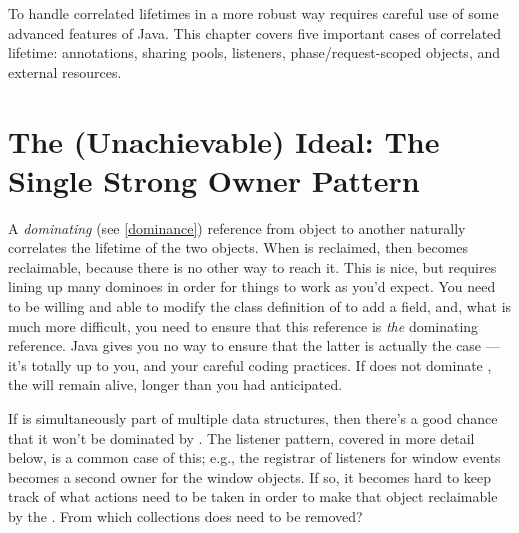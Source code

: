 To handle correlated lifetimes in a more robust way requires careful use of some
advanced features of Java. This chapter covers five important cases of
correlated lifetime: annotations, sharing pools, listeners, phase/request-scoped
objects, and external resources.


\section{The (Unachievable) Ideal: The Single Strong Owner Pattern}

A \emph{dominating} (see \autoref{dominance}) reference from object  to
another  naturally correlates the lifetime of the two objects. When
 is reclaimed, then  becomes reclaimable, because there is no
other way to reach it. This is nice, but requires lining  up many dominoes in
order for things to work as you'd expect. You need to be willing and able to
modify the class definition of  to add a field, and, what is much more
difficult, you need to ensure that this reference is \emph{the} dominating
reference. Java gives you no way to ensure that the latter is actually the case
--- it's totally up to you, and your careful coding practices. If  does
not dominate , the  will remain alive, longer than you had
anticipated.

If  is simultaneously part of multiple data structures, then there's a
good chance that it won't be dominated by . The listener pattern,
covered in more detail below, is a common case of this; e.g., the registrar of
listeners for window events becomes a second owner for the window objects. If
so, it becomes hard to keep track of what actions need to be taken in order to
make that object reclaimable by the \jre. From which collections does 
need to be removed?

